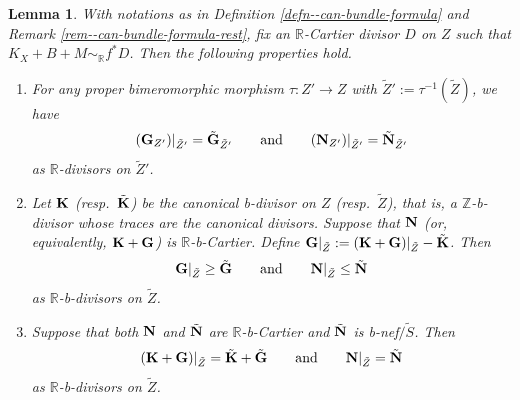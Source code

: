 \documentclass[12pt]{amsart}
\newtheorem{lem}[thm]{Lemma}
\theoremstyle{definition}
\begin{document}
\begin{lem}\label{lem--restriction-can-bundle-formula}
With notations as in Definition \ref{defn--can-bundle-formula} and Remark \ref{rem--can-bundle-formula-rest}, fix  an $\mathbb{R}$-Cartier divisor $D$ on $Z$ such that $K_{X}+B+M\sim_{\mathbb{R}}f^{*}D$. 
Then the following properties hold.
\begin{enumerate}[$(a)$]
\item\label{lem--restriction-can-bundle-formula-(a)}
For any proper bimeromorphic morphism $\tau \colon Z' \to Z$ with $\tilde{Z}':=\tau^{-1}(\tilde{Z})$, we have 
$$(\boldsymbol{\rm G}_{Z'})|_{\tilde{Z}'}=\tilde{\boldsymbol{\rm G}}_{\tilde{Z}'} \qquad {\rm and} \qquad (\boldsymbol{\rm N}_{Z'})|_{\tilde{Z}'}=\tilde{\boldsymbol{\rm N}}_{\tilde{Z}'}$$
as $\mathbb{R}$-divisors on $\tilde{Z}'$.

\item\label{lem--restriction-can-bundle-formula-(b)}
Let $\boldsymbol{\rm K}$ {\rm (}resp.~$\tilde{\boldsymbol{\rm K}}${\rm)} be the canonical b-divisor on $Z$ {\rm (}resp.~$\tilde{Z}${\rm )}, that is, a $\mathbb{Z}$-b-divisor whose traces are the canonical divisors. 
Suppose that $\boldsymbol{\rm N}$ {\rm (}or, equivalently, $\boldsymbol{\rm K}+\boldsymbol{\rm G}${\rm )} is $\mathbb{R}$-b-Cartier. 
Define $\boldsymbol{\rm G}|_{\tilde{Z}}:=(\boldsymbol{\rm K}+\boldsymbol{\rm G})|_{\tilde{Z}}-\tilde{\boldsymbol{\rm K}}$. 
Then 
$$\boldsymbol{\rm G}|_{\tilde{Z}}\geq \tilde{\boldsymbol{\rm G}} \qquad {\rm and} \qquad \boldsymbol{\rm N}|_{\tilde{Z}}\leq \tilde{\boldsymbol{\rm N}}$$
as $\mathbb{R}$-b-divisors on $\tilde{Z}$. 

\item\label{lem--restriction-can-bundle-formula-(c)}
Suppose that both $\boldsymbol{\rm N}$ and $\tilde{\boldsymbol{\rm N}}$ are $\mathbb{R}$-b-Cartier and $\tilde{\boldsymbol{\rm N}}$ is b-nef$/\tilde{S}$. 
Then
$$(\boldsymbol{\rm K}+\boldsymbol{\rm G})|_{\tilde{Z}} = \tilde{\boldsymbol{\rm K}}+\tilde{\boldsymbol{\rm G}} \qquad {\rm and} \qquad \boldsymbol{\rm N}|_{\tilde{Z}}=\tilde{\boldsymbol{\rm N}}$$
as $\mathbb{R}$-b-divisors on $\tilde{Z}$. 
\end{enumerate}
\end{lem}
\end{document}
